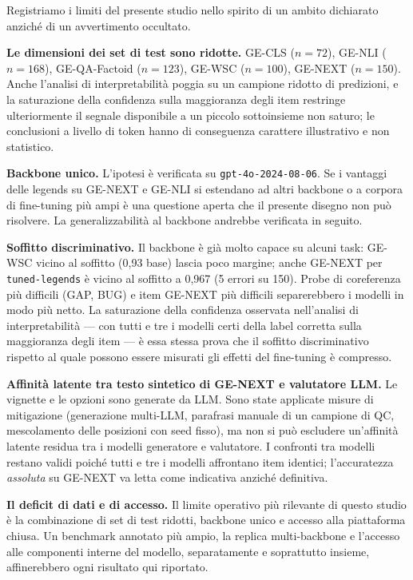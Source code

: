 \documentclass[pdflatex, sn-apa]{sn-jnl}%
\theoremstyle{thmstyleone}%
\theoremstyle{thmstyletwo}%
\theoremstyle{thmstylethree}%
\newcommand{\modellegends}{\texttt{tuned-legends}}
\begin{document}
Registriamo i limiti del presente studio nello spirito di un ambito dichiarato
anziché di un avvertimento occultato.

\textbf{Le dimensioni dei set di test sono ridotte.} GE-CLS ($n=72$), GE-NLI
($n=168$), GE-QA-Factoid ($n=123$), GE-WSC ($n=100$), GE-NEXT ($n=150$). Anche
l'analisi di interpretabilità poggia su un campione ridotto di predizioni, e la
saturazione della confidenza sulla maggioranza degli item restringe ulteriormente
il segnale disponibile a un piccolo sottoinsieme non saturo; le conclusioni a
livello di token hanno di conseguenza carattere illustrativo e non statistico.

\textbf{Backbone unico.} L'ipotesi è verificata su \texttt{gpt-4o-2024-08-06}. Se i
vantaggi delle legends su GE-NEXT e GE-NLI si estendano ad altri backbone o a
corpora di fine-tuning più ampi è una questione aperta che il presente disegno non
può risolvere. La generalizzabilità al backbone andrebbe verificata in seguito.

\textbf{Soffitto discriminativo.} Il backbone è già molto capace su alcuni task:
GE-WSC vicino al soffitto (0,93 base) lascia poco margine; anche GE-NEXT per
\modellegends{} è vicino al soffitto a 0,967 (5 errori su 150). Probe di
coreferenza più difficili (GAP, BUG) e item GE-NEXT più difficili separerebbero i
modelli in modo più netto. La saturazione della confidenza osservata nell'analisi
di interpretabilità --- con tutti e tre i modelli certi della label corretta sulla
maggioranza degli item --- è essa stessa prova che il soffitto discriminativo
rispetto al quale
possono essere misurati gli effetti del fine-tuning è compresso.

\textbf{Affinità latente tra testo sintetico di GE-NEXT e valutatore LLM.} Le
vignette e le opzioni sono generate da LLM. Sono state applicate misure di
mitigazione (generazione multi-LLM, parafrasi manuale di un campione di QC,
mescolamento delle posizioni con seed fisso), ma non si può escludere un'affinità
latente residua tra i modelli generatore e valutatore. I confronti tra modelli
restano validi poiché tutti e tre i modelli affrontano item identici;
l'accuratezza \emph{assoluta} su GE-NEXT va letta come indicativa anziché
definitiva.

\textbf{Il deficit di dati e di accesso.} Il limite operativo più rilevante di
questo studio è la combinazione di set di test ridotti, backbone unico e accesso
alla piattaforma chiusa. Un benchmark annotato più ampio, la replica multi-backbone
e l'accesso alle componenti interne del modello, separatamente e soprattutto
insieme, affinerebbero ogni risultato qui riportato.
\end{document}
